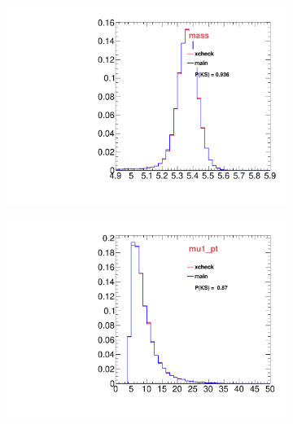 \begin{figure}
\begin{subfigure}[b]{0.2\textwidth}
                \includegraphics[width=\textwidth]{Figures/VariablesComparison/MC_endcaps_figs/m}
                \label{fig:MC_endcaps_m}
        \end{subfigure}
        \begin{subfigure}[b]{0.2\textwidth}
                \centering
                \includegraphics[width=\textwidth]{Figures/VariablesComparison/MC_endcaps_figs/m1pt}
                \label{fig:MC_endcaps_m1pt}
        \end{subfigure}
        \begin{subfigure}[b]{0.2\textwidth}
                \centering

\end{subfigure}
\end{figure}
